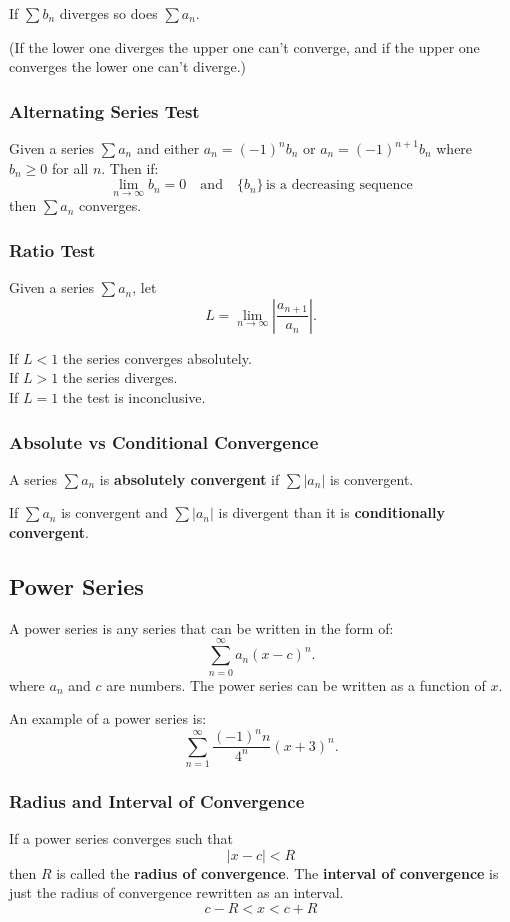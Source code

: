 \documentclass[12pt]{article}
\begin{document}
\noindent If $\displaystyle \sum b_n$ diverges so does $\displaystyle \sum a_n$.

\noindent (If the lower one diverges the upper one can't converge, and if the upper one converges the lower one can't diverge.)

\subsubsection{Alternating Series Test}
Given a series $\displaystyle \sum a_n$ and either $a_n = (-1)^n b_n$ or $a_n = (-1)^{n+1} b_n$ where $b_n \ge 0$ for all $n$. Then if:
\[ \lim_{n \to \infty} b_n = 0 \quad \text{and} \quad \{b_n\} \, \text{is a decreasing sequence} \]
then $\displaystyle \sum a_n$ converges.

\subsubsection{Ratio Test}
\noindent Given a series $\displaystyle \sum a_n$, let
\[ L = \lim_{n \to \infty} \left| \frac{a_{n+1}}{a_n} \right|. \]

\noindent If $L < 1$ the series converges absolutely.
\\ If $L > 1$ the series diverges.
\\ If $L = 1$ the test is inconclusive.

\subsubsection{Absolute vs Conditional Convergence}
\noindent A series $\displaystyle \sum a_n$ is \textbf{absolutely convergent} if $\displaystyle \sum |a_n|$ is convergent.

\noindent If $\displaystyle \sum a_n$ is convergent and $\displaystyle \sum |a_n|$ is divergent than it is \textbf{conditionally convergent}.

\subsection{Power Series}
A power series is any series that can be written in the form of:
\[ \sum_{n=0}^\infty a_n (x-c)^n. \]
where $a_n$ and $c$ are numbers. The power series can be written as a function of $x$.

\noindent An example of a power series is:
\[ \sum_{n=1}^\infty \frac{(-1)^n n}{4^n} (x+3)^n. \]

\subsubsection{Radius and Interval of Convergence}
\noindent If a power series converges such that
\[ |x-c| < R \]
then $R$ is called the \textbf{radius of convergence}. The \textbf{interval of convergence} is just the radius of convergence rewritten as an interval.
\[ c - R < x < c + R \]
\end{document}
